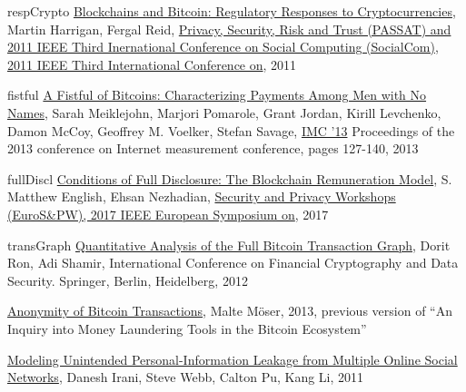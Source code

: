 \begin{thebibliography}{1}
\item{respCrypto}
\href{https://papers.ssrn.com/sol3/papers.cfm?abstract_id=2704852}
{Blockchains and Bitcoin: Regulatory Responses to Cryptocurrencies}, 
Martin Harrigan, Fergal Reid, 
\href{http://ieeexplore.ieee.org/xpl/mostRecentIssue.jsp?punumber=6112285}
{Privacy, Security, Risk and Trust (PASSAT) and 2011 IEEE Third Inernational
Conference on Social Computing (SocialCom), 2011 IEEE Third International
Conference on}, 2011

\item{fistful}
\href{https://cseweb.ucsd.edu/~smeiklejohn/files/imc13.pdf}{A Fistful of
Bitcoins: Characterizing Payments Among Men with No Names}, Sarah Meiklejohn,
Marjori Pomarole, Grant Jordan, Kirill Levchenko, Damon McCoy, Geoffrey M.
Voelker, Stefan Savage, 
\href{http://www.sigcomm.org/events/imc-conference/}{IMC '13} Proceedings of
the 2013 conference on Internet measurement conference, pages 127-140, 2013

\item{fullDiscl}
\href{http://ieeexplore.ieee.org/document/7966972/}{Conditions of Full
Disclosure: The Blockchain Remuneration Model}, S. Matthew English, 
Ehsan Nezhadian,
\href{http://ieeexplore.ieee.org/xpl/mostRecentIssue.jsp?punumber=7966454}
{Security and Privacy Workshops (EuroS\&PW), 2017 IEEE European Symposium on},
2017

\item{transGraph}
\href{http://arimoto.lolipop.jp/584.pdf}{Quantitative Analysis of the Full
Bitcoin Transaction Graph}, Dorit Ron, Adi Shamir, International Conference on
Financial Cryptography and Data Security. Springer, Berlin, Heidelberg, 2012

\item{}
\href{https://www.wi.uni-muenster.de/sites/wi/files/public/department/itsecurity/mbc13/mbc13-moeser-paper.pdf}
{Anonymity of Bitcoin Transactions}, Malte Möser, 2013, previous version of
``An Inquiry into Money Laundering Tools in the Bitcoin Ecosystem''

\href{https://www.cc.gatech.edu/projects/doi/Papers/DIrani_InternetComp_2011.pdf
}{Modeling Unintended Personal-Information Leakage from Multiple Online Social
Networks}, Danesh Irani, Steve Webb, Calton Pu, Kang Li, 2011
\end{thebibliography}

